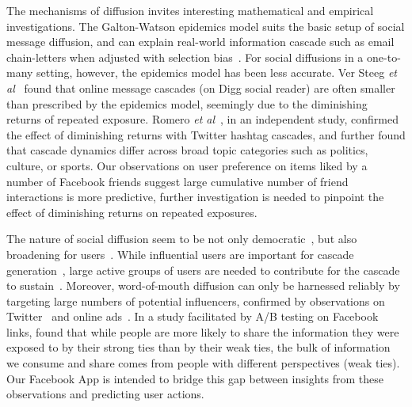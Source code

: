 The mechanisms of diffusion invites interesting mathematical and empirical investigations. 
The Galton-Watson epidemics model suits the basic setup of social
message diffusion, and can explain real-world information cascade such as
email chain-letters when adjusted with selection
bias~\cite{Golub2010selectionbiase}. For social diffusions in a
one-to-many setting, however, the epidemics model has been less
accurate. Ver Steeg {\it et al}~\cite{ver2011stops} found that online message cascades (on
Digg social reader) are often smaller than prescribed by the epidemics
model, seemingly due to the diminishing returns of repeated
exposure. Romero {\it et al}~\cite{Romero2011hashtag}, in an independent study, confirmed
the effect of diminishing returns with Twitter hashtag cascades, and
further found that cascade dynamics differ across broad topic
categories such as politics, culture, or sports. 
Our observations on user preference on items liked by a number of Facebook friends 
suggest large cumulative number of friend interactions is more predictive, 
further investigation is needed to pinpoint the effect of diminishing returns on repeated exposures.

The nature of social diffusion seem to be not only democratic~\cite{asur2011trends,Bakshy2011everyone}, but also broadening for users~\cite{Bakshy2012chamber}. While influential users are important for cascade generation~\cite{Bakshy2011everyone}, large active groups of users are needed to contribute for the cascade to sustain~\cite{asur2011trends}. Moreover, word-of-mouth diffusion can only be harnessed reliably by targeting large numbers of potential influencers, confirmed by observations on Twitter~\cite{Bakshy2011everyone} and online ads~\cite{influence}. In a study facilitated by A/B testing on Facebook links, \cite{Bakshy2012chamber} found that while people are more likely to share the information they were exposed to by their strong ties than by their weak ties, the bulk of information we consume and share comes from people with different perspectives (weak ties). Our Facebook App is intended to bridge this gap between insights from these observations and predicting user actions.

